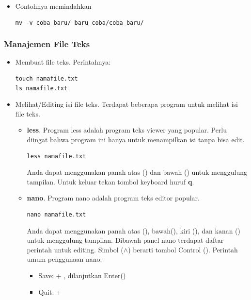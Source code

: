 \documentclass[12pt,]{article}
\begin{document}
\begin{itemize}
\begin{itemize}
			\item Contohnya memindahkan
			\begin{verbatim}
mv -v coba_baru/ baru_coba/coba_baru/
			\end{verbatim}
		\end{itemize}							
				
	\end{itemize}

	\subsubsection{Manajemen File Teks}
	\begin{itemize}
		\item Membuat file teks.
		Perintahnya:
		\begin{verbatim}
touch namafile.txt
ls namafile.txt
		\end{verbatim}
		
		\item Melihat/Editing isi file teks.
		Terdapat beberapa program untuk melihat isi file teks.
		\begin{itemize}
			\item \textbf{less}. Program less adalah program teks viewer yang popular.
			Perlu diingat bahwa program ini hanya untuk menampilkan isi tanpa bisa edit.
			\begin{verbatim}
less namafile.txt
			\end{verbatim}	
			Anda dapat menggunakan panah atas (\keys{\arrowkeyup}) dan bawah (\keys{\arrowkeydown}) untuk menggulung tampilan.
			Untuk keluar tekan tombol keyboard huruf \textbf{q}.
			
			\item \textbf{nano}. Program nano adalah program teks editor popular.
			\begin{verbatim}
nano namafile.txt
			\end{verbatim}
			Anda dapat menggunakan panah atas (\keys{\arrowkeyup}), bawah(\keys{\arrowkeydown}),
			kiri (\keys{\arrowkeyleft}), dan kanan (\keys{\arrowkeyright}) untuk menggulung tampilan.
			Dibawah panel nano terdapat daftar perintah untuk editing.
			Simbol ($\land$) berarti tombol Control ().
			Perintah umum penggunaan nano:
			\begin{itemize}
				\item Save:  + , dilanjutkan Enter(\keys{\return})
				\item Quit:  + 
			\end{itemize}
			

\end{itemize}
\end{itemize}
\end{document}
